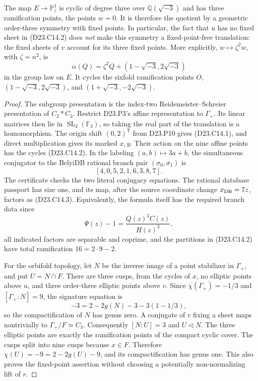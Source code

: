 The map $E\to\mathbb P^1_z$ is cyclic of degree three over
$\mathbb Q(\sqrt{-3})$ and has three ramification points, the points
$w=0$. It is therefore the quotient by a geometric order-three
symmetry with fixed points. In particular, the fact that $u$ has no
fixed sheet in (D23.C14.2) does \emph{not} make this symmetry a
fixed-point-free translation: the fixed sheets of $v$ account for
its three fixed points.
More explicitly, $w\mapsto\zeta^2w$, with $\zeta=n^2$, is
\[
       \alpha(Q)=\zeta^2Q+(1-\sqrt{-3},2\sqrt{-3})
\]
in the group law on $E$. It cycles the sixfold ramification points
$O$, $(1-\sqrt{-3},2\sqrt{-3})$, and
$(1+\sqrt{-3},-2\sqrt{-3})$.

\begin{proof}
The subgroup presentation is the index-two Reidemeister--Schreier
presentation of $C_2*C_3$. Restrict D23.P3's affine representation to
$\Gamma_+$. Its linear matrices then lie in
$\operatorname{SL}_2(\mathbb F_3)$, so taking the real part of the
translation is a homomorphism. The origin shift $(0,2)^{\mathsf T}$
from D23.P10 gives (D23.C14.1), and direct multiplication gives its
marked $x,y$. Their action on the nine affine points has the cycles
(D23.C14.2). In the labeling $(a,b)\mapsto3a+b$, the simultaneous
conjugator to the BelyiDB rational branch pair $(\sigma_0,\sigma_1)$ is
\[
                     [4,0,5,2,1,6,3,8,7].
\]
The certificate checks the two literal conjugacy equations. The
rational database passport has size one, and its map, after the
source coordinate change $x_{\rm DB}=7z$, factors as (D23.C14.3).
Equivalently, the formula itself has the required branch data since
\[
                 \Psi(z)-1=\frac{Q(z)^3C(z)}{H(z)^3},
\tag{D23.C14.7}
\]
all indicated factors are separable and coprime, and the partitions
in (D23.C14.2) have total ramification $16=2\cdot9-2$.

For the orbifold topology, let $N$ be the inverse image of a point
stabilizer in $\Gamma_+$, and put $U=N\cap F$. There are three
cusps, from the cycles of $x$, no elliptic points above $u$, and
three order-three elliptic points above $v$. Since
$\chi(\Gamma_+)=-1/3$ and $[\Gamma_+:N]=9$, the signature equation is
\[
 -3=2-2g(N)-3-3(1-1/3),
\]
so the compactification of $N$ has genus zero. A conjugate of $v$
fixing a sheet maps nontrivially to $\Gamma_+/F\simeq C_3$.
Consequently $[N:U]=3$ and $U\lhd N$. The three elliptic points are
exactly the ramification points of the compact cyclic cover.
The cusps split into nine cusps because $x\in F$. Therefore
$\chi(U)=-9=2-2g(U)-9$, and its compactification has genus one.
This also proves the fixed-point assertion without choosing a
potentially non-normalizing lift of $r$.


\end{proof}
